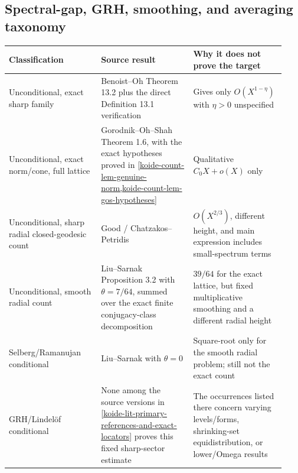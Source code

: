 \subsection{Spectral-gap, GRH, smoothing, and averaging taxonomy}\label{koide-lit-spectral-gap-grh-smoothing-and-averaging-taxonomy}

\begin{longtable}[]{@{}
  >{\raggedright\arraybackslash}p{0.31\linewidth}
  >{\raggedright\arraybackslash}p{0.31\linewidth}
  >{\raggedright\arraybackslash}p{0.31\linewidth}@{}}
\toprule\noalign{}
\begin{minipage}[b]{\linewidth}\raggedright
Classification
\end{minipage} & \begin{minipage}[b]{\linewidth}\raggedright
Source result
\end{minipage} & \begin{minipage}[b]{\linewidth}\raggedright
Why it does not prove the target
\end{minipage} \\
\midrule\noalign{}
\endhead
\bottomrule\noalign{}
\endlastfoot
Unconditional, exact sharp family & Benoist--Oh Theorem 13.2 plus the direct Definition 13.1 verification & Gives only \(O(X^{1-\eta})\) with \(\eta>0\) unspecified \\
Unconditional, exact norm/cone, full lattice & Gorodnik--Oh--Shah Theorem 1.6, with the exact hypotheses proved in \cref{koide-count-lem-genuine-norm,koide-count-lem-gos-hypotheses} & Qualitative \(C_0X+o(X)\) only \\
Unconditional, sharp radial closed-geodesic count & Good / Chatzakos--Petridis & \(O(X^{2/3})\), different height, and main expression includes small-spectrum terms \\
Unconditional, smooth radial count & Liu--Sarnak Proposition 3.2 with \(\theta=7/64\), summed over the exact finite conjugacy-class decomposition & \(39/64\) for the exact lattice, but fixed multiplicative smoothing and a different radial height \\
Selberg/Ramanujan conditional & Liu--Sarnak with \(\theta=0\) & Square-root only for the smooth radial problem; still not the exact count \\
GRH/Lindelöf conditional & None among the source versions in \cref{koide-lit-primary-references-and-exact-locators} proves this fixed sharp-sector estimate & The occurrences listed there concern varying levels/forms, shrinking-set equidistribution, or lower/Omega results \\

\end{longtable}
